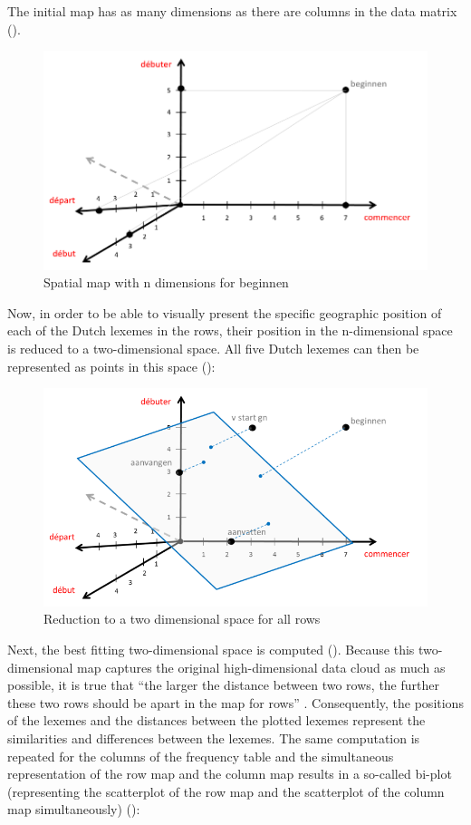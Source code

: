 The initial map has as many dimensions as there are columns in the data matrix ().

\begin{figure}
\includegraphics[height=.3\textheight]{figures/Vandevoorde2-img16.png}
\caption{Spatial map with n dimensions for beginnen \label{fig:3:16}}
\end{figure}

Now, in order to be able to visually present the specific geographic position of each of the Dutch lexemes in the rows, their position in the n-dimensional space is reduced to a two-dimensional space. All five Dutch lexemes can then be  represented as points in this space ():

\begin{figure}
\includegraphics[height=.3\textheight]{figures/Vandevoorde2-img17.png}
\caption{Reduction to a two dimensional space for all rows \label{fig:3:17}}
\end{figure}

Next, the best fitting two-dimensional space is computed (). Because this two-dimensional map captures the original high-dimensional data cloud as much as possible, it is true that “the larger the distance between two rows, the further these two rows should be apart in the map for rows” \citep[129]{baayen_analyzing_2008}. Consequently, the positions of the lexemes and the distances between the plotted lexemes represent the similarities and differences between the lexemes. The same computation is repeated for the columns of the frequency table and the simultaneous representation of the row map and the column map results in a so-called bi-plot (representing the scatterplot of the row map and the scatterplot of the column map simultaneously) ():

